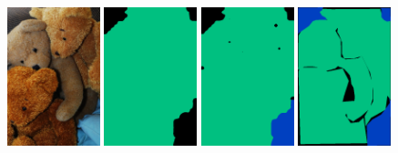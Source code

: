 \begin{figure}[tbh!]
  {\includegraphics[width=0.24\textwidth]{figures/experiments/coco/image/0004.jpg}}
  {\includegraphics[width=0.24\textwidth]{figures/experiments/coco/orgckpt/0004.png}}
  {\includegraphics[width=0.24\textwidth]{figures/experiments/coco/nonnoisy/0004.png}}
  {\includegraphics[width=0.24\textwidth]{figures/experiments/coco/gt/000000000776_instanceTrainIds.png}}
  

\end{figure}
